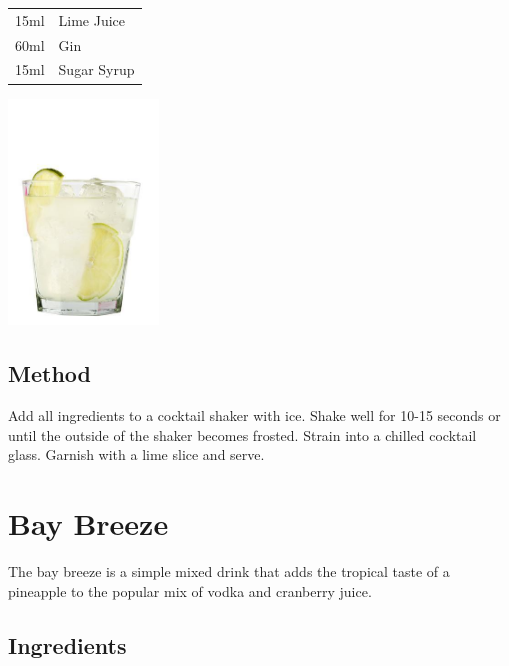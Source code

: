 \documentclass[12pt, letterpaper]{article}
\begin{document}
\begin{multicols}{2}

\begin{tabular} { r | l}
    15ml & Lime Juice \\
    60ml & Gin  \\
    15ml & Sugar Syrup  \\
\end{tabular}

\includegraphics[height=6cm]{gimlet}

\end{multicols}

\subsection*{Method}
Add all ingredients to a cocktail shaker with ice.
Shake well for 10-15 seconds or until the outside of the shaker becomes frosted.
Strain into a chilled cocktail glass. Garnish with a lime slice and serve.

\pagebreak
\section{Bay Breeze}
The bay breeze is a simple mixed drink that adds the tropical taste of a pineapple to the popular mix of vodka and cranberry juice.
\subsection*{Ingredients}
\end{document}
